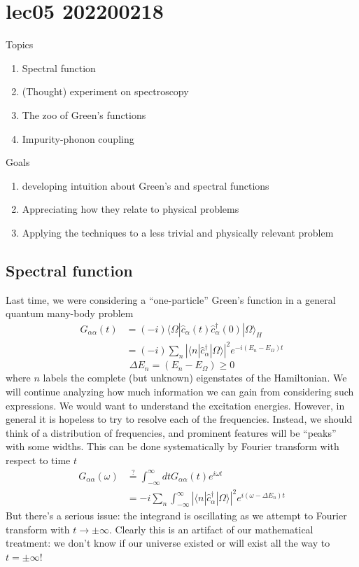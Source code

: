 \chapter{lec05 202200218}

Topics

\begin{enumerate}
    \item Spectral function
    \item (Thought) experiment on spectroscopy
    \item The zoo of Green's functions
    \item Impurity-phonon coupling
\end{enumerate}

Goals

\begin{enumerate}
    \item developing intuition about Green's and spectral functions
    \item Appreciating how they relate to physical problems
    \item Applying the techniques to a less trivial and physically relevant problem
\end{enumerate}

\section{Spectral function}

Last time, we were considering a ``one-particle'' Green's function in a general quantum many-body problem
\begin{align*}
    G_{\alpha \alpha}\left( t \right) &=\left( -i \right) \langle \Omega |\hat{c}_{\alpha}\left( t \right) \hat{c}_{\alpha}^{\dagger}\left( 0 \right) |\Omega \rangle _H\\
    &=\left( -i \right) \sum_n{\left| \langle n|\hat{c}_{\alpha}^{\dagger}|\Omega \rangle \right|^2e^{-i\left( E_n-E_{\Omega} \right) t}}
\end{align*}
\[ \Delta E_n=\left( E_n-E_{\Omega} \right) \ge 0\]
where $n$ labels the complete (but unknown) eigenstates of the Hamiltonian. We will continue analyzing how much information we can gain from considering such expressions. We would want to understand the excitation energies. However, in general it is hopeless to try to resolve each of the frequencies. Instead, we should think of a distribution of frequencies, and prominent features will be ``peaks'' with some widths. This can be done systematically by Fourier transform with respect to time $t$
\begin{align*}
    G_{\alpha \alpha}\left( \omega \right) &\stackrel{?}{=} \int_{-\infty}^{\infty}{dtG_{\alpha \alpha}\left( t \right) e^{i\omega t}}\\
    &=-i\sum_n{\int_{-\infty}^{\infty}{\left| \langle n|\hat{c}_{\alpha}^{\dagger}|\Omega \rangle \right|^2e^{i\left( \omega -\Delta E_n \right) t}}}
\end{align*}
But there's a serious issue: the integrand is oscillating as we attempt to Fourier transform with $t\to \pm\infty$. Clearly this is an artifact of our mathematical treatment: we don't know if our universe existed or will exist all the way to $t=\pm\infty$!

